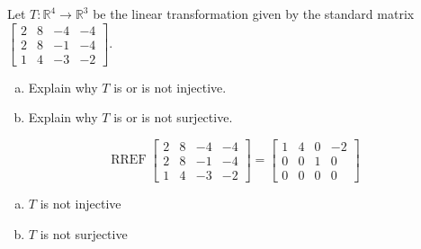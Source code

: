 
\begin{exerciseStatement}
 Let \(T:\mathbb{R}^ 4  \to \mathbb{R}^ 3 \) be the linear transformation given by the standard matrix \( \left[\begin{array}{cccc}
2 & 8 & -4 & -4 \\
2 & 8 & -1 & -4 \\
1 & 4 & -3 & -2
\end{array}\right] .\)
\begin{enumerate}[(a)]
\item Explain why \(T\) is or is not injective.
\item Explain why \(T\) is or is not surjective.
\end{enumerate}
    
\end{exerciseStatement}
    
\begin{exerciseAnswer} 


\[\operatorname{RREF} \left[\begin{array}{cccc}
2 & 8 & -4 & -4 \\
2 & 8 & -1 & -4 \\
1 & 4 & -3 & -2
\end{array}\right] = \left[\begin{array}{cccc}
1 & 4 & 0 & -2 \\
0 & 0 & 1 & 0 \\
0 & 0 & 0 & 0
\end{array}\right] \]


\begin{enumerate}[(a)]
\item \(T\) is not injective
\item \(T\) is not surjective
\end{enumerate}
    
\end{exerciseAnswer}
    
